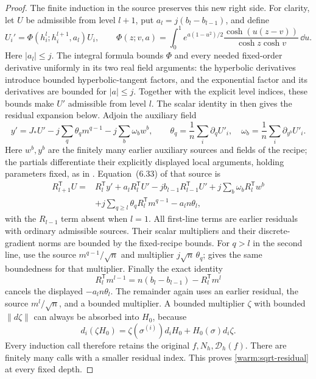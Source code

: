 \begin{proof}
The finite induction in the source preserves this new right side.
For clarity, let \(U\) be admissible from level \(l+1\), put
\(a_l=j(b_l-b_{l-1})\), and define
\[
 U_i'=\Phi(h_i^l;h_i^{l+1},a_l)U_i,\qquad
 \Phi(z;v,a)=\int_0^1
 e^{a(1-u^2)/2}\frac{\cosh(u(z-v))}{\cosh z\cosh v}\,\dd u .
\]
Here \(|a_l|\le j\).  The integral formula bounds \(\Phi\) and every
needed fixed-order derivative uniformly in its two real field arguments:
the hyperbolic derivatives introduce bounded hyperbolic-tangent factors,
and the exponential factor and its derivatives are bounded for
\(|a|\le j\).  Together with the explicit level indices, these bounds
make \(U'\) admissible from level \(l\).  The scalar identity in
\cite[Section~6]{SG} then gives the residual expansion below.  Adjoin
the auxiliary field
\[
 y'=J_*U'-j\sum_q\theta_qm^{q-1}
              -j\sum_b\omega_bw^b,\qquad
 \theta_q=\frac1n\sum_i\partial_qU'_i,\quad
 \omega_b=\frac1n\sum_i\partial_{y^b}U'_i .
\]
Here \(w^b,y^b\) are the finitely many earlier auxiliary sources and
fields of the recipe; the partials differentiate their explicitly
displayed local arguments, holding parameters fixed, as in
\cite[Definition~6.2]{SG}.  Equation~(6.33) of that source is
\begin{align*}
 R_{l+1}^{\mathsf T}U
 ={}&R_l^{\mathsf T}y'+a_lR_l^{\mathsf T}U'
       -jb_{l-1}R_{l-1}^{\mathsf T}U'
       +j\sum_b\omega_bR_l^{\mathsf T}w^b\\
 &+j\sum_{q\ge l}\theta_qR_l^{\mathsf T}m^{q-1}
       -a_ln\theta_l ,
\end{align*}
with the \(R_{l-1}\) term absent when \(l=1\).  All first-line terms
are earlier residuals with ordinary admissible sources.  Their scalar
multipliers and their discrete-gradient norms are bounded by the
fixed-recipe bounds.  For \(q>l\) in the second line, use the source
\(m^{q-1}/\sqrt n\) and multiplier \(j\sqrt n\,\theta_q\);
\cite[Equation~(6.21)]{SG} gives the same boundedness for that
multiplier.  Finally the exact identity
\[
 R_l^{\mathsf T}m^{l-1}
       =n(b_l-b_{l-1})-R_l^{\mathsf T}m^l
\]
cancels the displayed \(-a_ln\theta_l\).  The remainder again uses
an earlier residual, the source \(m^l/\sqrt n\), and a bounded
multiplier.  A bounded multiplier \(\zeta\) with bounded \(\|d\zeta\|\)
can always be absorbed into \(H_0\), because
\[
 d_i(\zeta H_0)=\zeta(\sigma^{(i)})d_iH_0+H_0(\sigma)d_i\zeta .
\]
Every induction call therefore retains the original \(f,N_h,\mathcal D_h(f)\).
There are finitely many calls with a smaller residual index.  This
proves \eqref{warm:sqrt-residual} at every fixed depth.


\end{proof}
